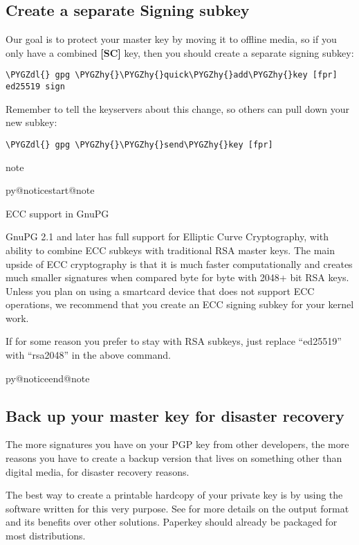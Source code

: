 \documentclass[a4paper,8pt,english]{sphinxmanual}
\makeatletter
\renewenvironment{notice}[2]{%
          \def\py@noticetype{#1}
          \begin{coloredbox}{#1}
          \bf\it
          \par\strong{#2}
          \csname py@noticestart@#1\endcsname
        }
	{
          \csname py@noticeend@\py@noticetype\endcsname
          \end{coloredbox}
        }
\def\PYGZdl{\char`\$}
\def\PYGZhy{\char`\-}
\makeatother
\begin{document}
\subsection{Create a separate Signing subkey}
\label{process/maintainer-pgp-guide:create-a-separate-signing-subkey}
Our goal is to protect your master key by moving it to offline media, so
if you only have a combined \textbf{{[}SC{]}} key, then you should create a separate
signing subkey:

\begin{Verbatim}[commandchars=\\\{\}]
\PYGZdl{} gpg \PYGZhy{}\PYGZhy{}quick\PYGZhy{}add\PYGZhy{}key [fpr] ed25519 sign
\end{Verbatim}

Remember to tell the keyservers about this change, so others can pull down
your new subkey:

\begin{Verbatim}[commandchars=\\\{\}]
\PYGZdl{} gpg \PYGZhy{}\PYGZhy{}send\PYGZhy{}key [fpr]
\end{Verbatim}

\begin{notice}{note}{Note:}
ECC support in GnuPG

GnuPG 2.1 and later has full support for Elliptic Curve
Cryptography, with ability to combine ECC subkeys with traditional
RSA master keys. The main upside of ECC cryptography is that it is
much faster computationally and creates much smaller signatures when
compared byte for byte with 2048+ bit RSA keys. Unless you plan on
using a smartcard device that does not support ECC operations, we
recommend that you create an ECC signing subkey for your kernel
work.

If for some reason you prefer to stay with RSA subkeys, just replace
``ed25519'' with ``rsa2048'' in the above command.
\end{notice}


\subsection{Back up your master key for disaster recovery}
\label{process/maintainer-pgp-guide:back-up-your-master-key-for-disaster-recovery}
The more signatures you have on your PGP key from other developers, the
more reasons you have to create a backup version that lives on something
other than digital media, for disaster recovery reasons.

The best way to create a printable hardcopy of your private key is by
using the  software written for this very purpose. See  for more details on the output format and its benefits over
other solutions. Paperkey should already be packaged for most
distributions.
\end{document}
